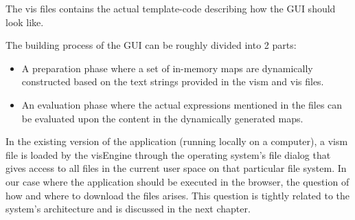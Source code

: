 The vis files contains the actual template-code describing how the GUI should look like.

The building process of the GUI can be roughly divided into 2 parts:
\begin{itemize}
    \item A preparation phase where a set of in-memory maps are dynamically constructed based on the text strings provided in the vism and vis files.
    \item An evaluation phase where the actual expressions mentioned in the files can be evaluated upon the content in the dynamically generated maps.
\end{itemize}

In the existing version of the application (running locally on a computer), a vism file is loaded by the visEngine through the operating system's file dialog that gives access to all files in the current user space on that particular file system. In our case where the application should be executed in the browser, the question of how and where to download the files arises. This question is tightly related to the system's architecture and is discussed in the next chapter.

\fi